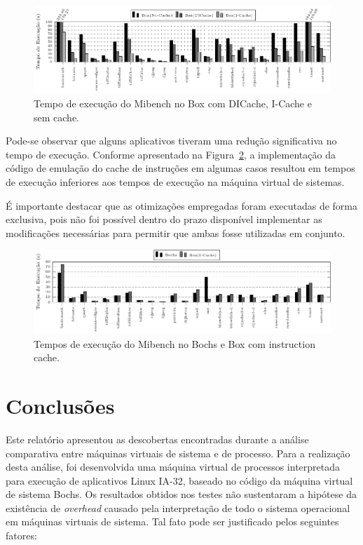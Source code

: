 \documentclass[11pt,twoside]{article}
\begin{document}
\begin{figure}[h]
	\centering
	\includegraphics[width=1.0\textwidth]{figures/dicache_nocache}
	\caption{Tempo de execução do Mibench no Box com DICache, I-Cache e sem cache.}
	\label{fig:dicache_nocache}
\end{figure}

Pode-se observar que alguns aplicativos tiveram uma redução significativa no
tempo de execução. Conforme apresentado na Figura~\ref{fig:bochs_icache}, a
implementação da código de emulação do cache de instruções em algumas casos
resultou em tempos de execução inferiores aos tempos de execução na máquina
virtual de sistemas.

É importante destacar que as otimizações empregadas foram executadas de forma
exclusiva, pois não foi possível dentro do prazo disponível implementar as
modificações necessárias para permitir que ambas fosse utilizadas em conjunto.

\begin{figure}[h]
        \centering
        \includegraphics[width=1.0\textwidth]{figures/bochs_icache}
        \caption{Tempos de execução do Mibench no Bochs e Box com instruction cache.}
        \label{fig:bochs_icache}
\end{figure}

\section{Conclusões} \label{sec:conclusao}

Este relatório apresentou as descobertas encontradas durante a análise
comparativa entre máquinas virtuais de sistema e de processo.  Para a realização
desta análise, foi desenvolvida uma máquina virtual de processos interpretada
para execução de aplicativos Linux IA-32, baseado no código da máquina virtual
de sistema Bochs.  
Os resultados obtidos nos testes não sustentaram a hipótese da
existência de \emph{overhead} causado pela interpretação de todo o sistema operacional
em máquinas virtuais de sistema. Tal fato pode ser justificado pelos seguintes
fatores:
\end{document}
